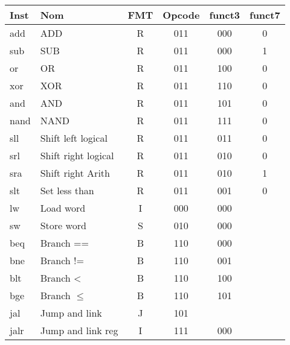 \documentclass[a4paper]{article}
\begin{document}
    \begin{tabular}{|l|l|c|c|c|c|}
        \hline
        Inst & Nom                  & FMT & Opcode & funct3 & funct7 \\
        \hline
        add  & ADD                  & R   & 011    & 000    & 0      \\
        sub  & SUB                  & R   & 011    & 000    & 1      \\
        or   & OR                   & R   & 011    & 100    & 0      \\
        xor  & XOR                  & R   & 011    & 110    & 0      \\
        and  & AND                  & R   & 011    & 101    & 0      \\
        nand & NAND                 & R   & 011    & 111    & 0      \\
        sll  & Shift left logical   & R   & 011    & 011    & 0      \\
        srl  & Shift right logical  & R   & 011    & 010    & 0      \\
        sra  & Shift right Arith    & R   & 011    & 010    & 1      \\
        slt  & Set less than        & R   & 011    & 001    & 0      \\
        \hline
        lw   & Load word            & I   & 000    & 000    &        \\
        sw   & Store word           & S   & 010    & 000    &        \\
        \hline
        beq  & Branch ==            & B   & 110    & 000    &        \\
        bne  & Branch !=            & B   & 110    & 001    &        \\
        blt  & Branch <             & B   & 110    & 100    &        \\
        bge  & Branch \(\leqslant\) & B   & 110    & 101    &        \\
        \hline
        jal  & Jump and link        & J   & 101    &        &        \\
        jalr & Jump and link reg    & I   & 111    & 000    &        \\
        \hline
    \end{tabular}
\end{document}
